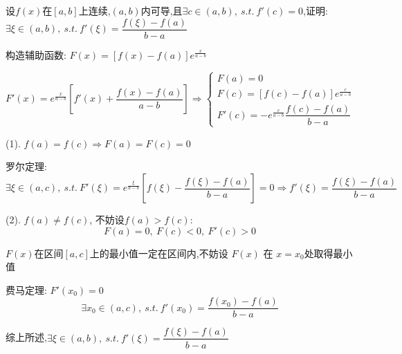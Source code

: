 \begin{proposition}
	设$f(x)$在$[a,b]$上连续,$(a,b)$内可导,且$\exists c\in(a,b),\ s.t.\ f'(c)=0$,证明: $\exists \xi\in(a,b),\ s.t.\ f'(\xi)=\dfrac{f(\xi)-f(a)}{b-a}$
\end{proposition}
\begin{solution}

	构造辅助函数: $F(x)=\left[f(x)-f(a)\right]e^{\frac{x}{a-b}}$

	$$F'(x)=e^{\frac{x}{a-b}}\left[f'(x)+\dfrac{f(x)-f(a)}{a-b}\right]\Rightarrow
	\begin{cases}
		F(a)=0\\ 
		F(c)=[f(c)-f(a)]e^{\frac{c}{a-b}}\\ 
		F'(c)=-e^{\frac{c}{a-b}}\dfrac{f(c)-f(a)}{b-a}
	\end{cases}$$

	(1). $f(a)=f(c)\Rightarrow F(a) = F(c) = 0$
	
	罗尔定理:
	$$\exists \xi\in(a,c),\ s.t.\ F'(\xi)=e^{\frac{\xi}{a-b}}[f(\xi)-\dfrac{f(\xi)-f(a)}{b-a}]=0\Rightarrow f'(\xi)=\dfrac{f(\xi)-f(a)}{b-a}$$

	(2). $f(a)\neq f(c)$, 不妨设$f(a)>f(c)$:
	$$F(a)=0,\ F(c)<0,\ F'(c)>0$$

	$F(x)$在区间$[a,c]$上的最小值一定在区间内,不妨设 $F(x)$ 在 $x=x_{0}$处取得最小值
	
	费马定理: $F'(x_{0})=0$
	$$\exists x_{0}\in(a,c),\ s.t.\ f'(x_{0})=\dfrac{f(x_{0})-f(a)}{b-a}$$

	综上所述,$\exists \xi\in(a,b),\ s.t.\ f'(\xi)=\dfrac{f(\xi)-f(a)}{b-a}$
\end{solution}

